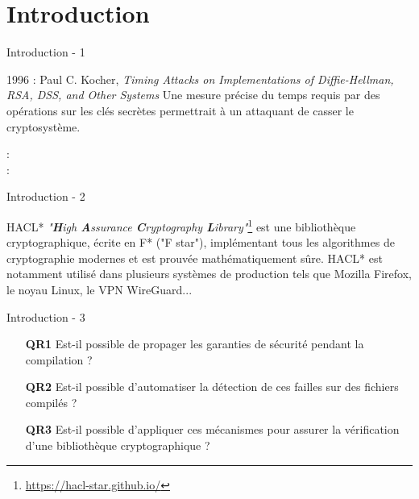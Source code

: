 \documentclass{backend/backend}
\begin{document}
\justifying

\begin{frame}
    \titlepage
\end{frame}

\section*{Introduction}
\showtoctrue %

\begin{frame}{Introduction - 1}
    
    \pause
    \begin{block}{1996 : Paul C. Kocher, \textit{Timing Attacks on Implementations of Diffie-Hellman, RSA, DSS, and Other Systems} }
        Une mesure précise du temps requis par des opérations sur les clés secrètes permettrait à un attaquant de casser le cryptosystème.
    \end{block}

     : \citeauthor{270176} \\
     : \citeauthor{stillPractical} 
\end{frame}

\begin{frame}{Introduction - 2}
    \begin{exampleblock}{HACL*}
        \textit{"\textbf{H}igh \textbf{A}ssurance \textbf{C}ryptography \textbf{L}ibrary"}\footnote{\url{https://hacl-star.github.io/}} est une bibliothèque cryptographique, écrite en F* ("F star"), implémentant tous les algorithmes de cryptographie modernes et est prouvée mathématiquement sûre. 
        \smallbreak
        HACL* est notamment utilisé dans plusieurs systèmes de production tels que Mozilla Firefox, le noyau Linux, le VPN WireGuard...
    \end{exampleblock}
\end{frame}

\begin{frame}{Introduction - 3}
    \begin{enumerate}
        \item[\textbf{QR1}] Est-il possible de propager les garanties de sécurité pendant la compilation ?
        \item[\textbf{QR2}] Est-il possible d'automatiser la détection de ces failles sur des fichiers compilés ?
        \item[\textbf{QR3}] Est-il possible d'appliquer ces mécanismes pour assurer la vérification d'une bibliothèque cryptographique ?
    \end{enumerate}
\end{frame}
\end{document}
